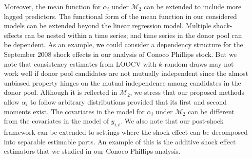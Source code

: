 \documentclass[11pt]{article}
\def\mc#1{\mathcal{#1}} %
\theoremstyle{definition}
\begin{document}
Moreover, the mean function for $\alpha_i$ under $\mc{M}_2$ can be extended to include more lagged predictors. The functional form of the mean function in our considered models can be extended beyond the linear regression model. Multiple shock-effects can be nested within a time series; and time series in the donor pool can be dependent. As an example, we could consider a dependency structure for the September 2008 shock effects in our analysis of Conoco Phillips stock. But we note that consistency estimates from LOOCV with $k$ random draws may not work well if donor pool candidates are not mutually independent since the almost unbiased property hinges on the mutual independence among candidates in the donor pool.
Although it is reflected in $\mc{M}_2$, we stress that our proposed methods allow $\alpha_i$ to follow arbitrary distributions provided that its first and second moments exist. The covariates in the model for $\alpha_i$ under $\mc{M}_2$ can be different from the covariates in the model of $y_{i,t}$. We also note that our post-shock framework can be extended to settings where the shock effect can be decomposed into separable estimable parts. An example of this is the additive shock effect estimators that we studied in our Conoco Phillips analysis. 
\end{document}
